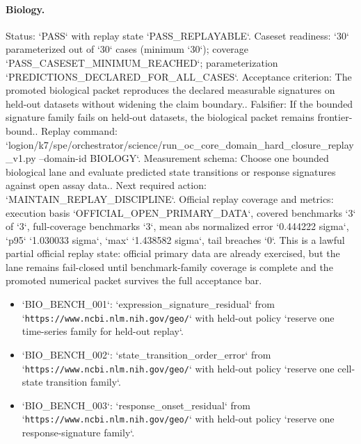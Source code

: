 \paragraph{Biology.}
Status: `PASS` with replay state `PASS\_REPLAYABLE`.
Caseset readiness: `30` parameterized out of `30` cases (minimum `30`); coverage `PASS\_CASESET\_MINIMUM\_REACHED`; parameterization `PREDICTIONS\_DECLARED\_FOR\_ALL\_CASES`.
Acceptance criterion: The promoted biological packet reproduces the declared measurable signatures on held-out datasets without widening the claim boundary..
Falsifier: If the bounded signature family fails on held-out datasets, the biological packet remains frontier-bound..
Replay command: `logion/k7/spe/orchestrator/science/run\_oc\_core\_domain\_hard\_closure\_replay\_v1.py --domain-id BIOLOGY`.
Measurement schema: Choose one bounded biological lane and evaluate predicted state transitions or response signatures against open assay data..
Next required action: `MAINTAIN\_REPLAY\_DISCIPLINE`.
Official replay coverage and metrics: execution basis `OFFICIAL\_OPEN\_PRIMARY\_DATA`, covered benchmarks `3` of `3`, full-coverage benchmarks `3`, mean abs normalized error `0.444222 sigma`, `p95` `1.030033 sigma`, `max` `1.438582 sigma`, tail breaches `0`.
This is a lawful partial official replay state: official primary data are already exercised, but the lane remains fail-closed until benchmark-family coverage is complete and the promoted numerical packet survives the full acceptance bar.
\begin{itemize}
\item `BIO\_BENCH\_001`: `expression\_signature\_residual` from `\texttt{https://www.ncbi.nlm.nih.gov/geo/}` with held-out policy `reserve one time-series family for held-out replay`.
\item `BIO\_BENCH\_002`: `state\_transition\_order\_error` from `\texttt{https://www.ncbi.nlm.nih.gov/geo/}` with held-out policy `reserve one cell-state transition family`.
\item `BIO\_BENCH\_003`: `response\_onset\_residual` from `\texttt{https://www.ncbi.nlm.nih.gov/geo/}` with held-out policy `reserve one response-signature family`.
\end{itemize}

